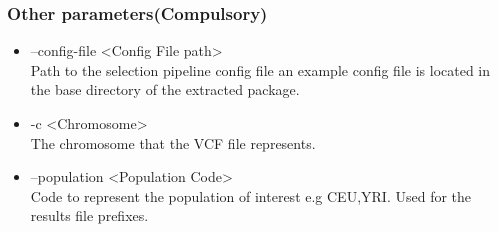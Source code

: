 \documentclass[a4paper,10pt]{article}
\begin{document}
\subsubsection{Other parameters(Compulsory)}
\begin{itemize}
\item --config-file <Config File path>\\
Path to the selection pipeline config file an example config file is located in the base directory of the extracted package.
\item -c <Chromosome>\\
The chromosome that the VCF file represents.
\item --population <Population Code>\\
Code to represent the population of interest e.g CEU,YRI. Used for the results file prefixes.

\end{itemize}
\end{document}
